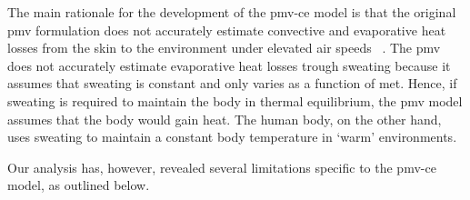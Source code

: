 The main rationale for the development of the \ac{pmv-ce} model is that the original \ac{pmv} formulation does not accurately estimate convective and evaporative heat losses from the skin to the environment under elevated air speeds ~\cite{huang_applicability_2014}.
The \ac{pmv} does not accurately estimate evaporative heat losses trough sweating because it assumes that sweating is constant and only varies as a function of \ac{met}.
Hence, if sweating is required to maintain the body in thermal equilibrium, the \ac{pmv} model assumes that the body would gain heat.
The human body, on the other hand, uses sweating to maintain a constant body temperature in `warm' environments.

Our analysis has, however, revealed several limitations specific to the \ac{pmv-ce} model, as outlined below.


